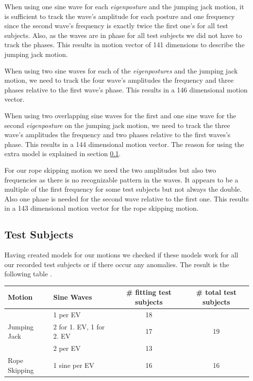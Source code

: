 \documentclass[a4paper]{article}
\begin{document}
When using one sine wave for each \emph{eigenposture} and the jumping jack motion, it is sufficient to track the wave's amplitude for each posture and one frequency since the second wave's frequency is exactly twice the first one's for all test subjects.
Also, as the waves are in phase for all test subjects we did not have to track the phases.
This results in motion vector of 141 dimensions to describe the jumping jack motion.

When using two sine waves for each of the \emph{eigenpostures} and the jumping jack motion, we need to track the four wave's amplitudes the frequency and three phases relative to the first wave's phase.
This results in a 146 dimensional motion vector.

When using two overlapping sine waves for the first and one sine wave for the second \emph{eigenposture} on the jumping jack motion, we need to track the three wave's amplitudes the frequency and two phases relative to the first waves's phase.
This results in a 144 dimensional motion vector.
The reason for using the extra model is explained in section \ref{sec:testsubjects}.

For our rope skipping motion we need the two amplitudes but also two frequencies as there is no recognizable pattern in the waves.
It appears to be a multiple of the first frequency for some test subjects but not always the double.
Also one phase is needed for the second wave relative to the first one.
This results in a 143 dimensional motion vector for the rope skipping motion.

\subsection{Test Subjects}
\label{sec:testsubjects}
Having created models for our motions we checked if these models work for all our recorded test subjects or if there occur any anomalies.
The result is the following table .

\begin{center}
\begin{tabular}{l|l|c|c}
Motion & Sine Waves & \# fitting test subjects & \# total test subjects \\
\hline
\multirow{3}{*}{Jumping Jack} & 1 per EV & 18 & \multirow{3}{*}{19} \\ \cline{2-3}
 & 2 for 1. EV, 1 for 2. EV  & 17 \\ \cline{2-3}
 & 2 per EV & 13 \\ \cline{2-3}
\hline
Rope Skipping & 1 sine per EV & 16 & 16 \\
\end{tabular}
\end{center}
\end{document}
